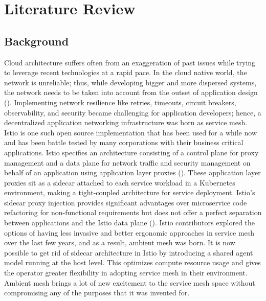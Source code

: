 \section{Literature Review}

\subsection{Background}
Cloud architecture suffers often from an exaggeration of past issues while trying to leverage recent technologies at a rapid pace. In the cloud native world, the network is unreliable; thus, while developing bigger and more dispersed systems, the network needs to be taken into account from the outset of application design (\cite{posta2022Design}). Implementing network resilience like retries, timeouts, circuit breakers, observability, and security became challenging for application developers; hence, a decentralized application networking infrastructure was born as service mesh. Istio is one such open source implementation that has been used for a while now and has been battle tested by many corporations with their business critical applications. Istio specifies an architecture consisting of a control plane for proxy management and a data plane for network traffic and security management on behalf of an application using application layer proxies (\cite{posta2022Layers}). These application layer proxies sit as a sidecar attached to each service workload in a Kubernetes environment, making a tight-coupled architecture for service deployment. Istio's sidecar proxy injection provides significant advantages over microservice code refactoring for non-functional requirements but does not offer a perfect separation between applications and the Istio data plane (\cite{istioHoward2022}). Istio contributors explored the options of having less invasive and better ergonomic approaches in service mesh over the last few years, and as a result, ambient mesh was born. It is now possible to get rid of sidecar architecture in Istio by introducing a shared agent model running at the host level. This optimizes compute resource usage and gives the operator greater flexibility in adopting service mesh in their environment. Ambient mesh brings a lot of new excitement to the service mesh space without compromising any of the purposes that it was invented for.

